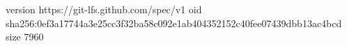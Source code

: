 version https://git-lfs.github.com/spec/v1
oid sha256:0ef3a17744a3e25cc3f32ba58c092e1ab404352152c40fee07439dbb13ac4bcd
size 7960
